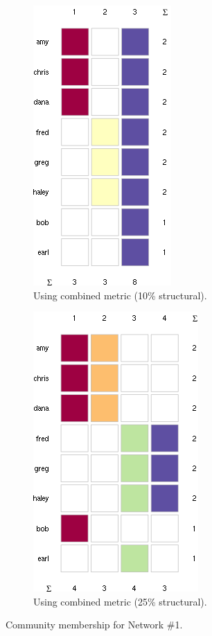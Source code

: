 \documentclass{report} %
\begin{document}
\begin{figure}[htp!]
  \centering
  \begin{subfigure}{.4\textwidth}
    \centering
    \includegraphics[width=.6\linewidth]{toy2/ea/top20_0.1.png}
    \caption{Using combined metric (10\% structural).}
    \label{fig:net1_member_struct}
  \end{subfigure}%
  \begin{subfigure}{.6\textwidth}
    \centering
    \includegraphics[width=.5\linewidth]{toy2/ea/top20_0.25.png}
    \caption{Using combined metric (25\% structural).}
    \label{fig:net1_member_both}
  \end{subfigure}
  \caption{Community membership for Network \#1.}
  \label{fig:net1_member}
\end{figure}
\end{document}
